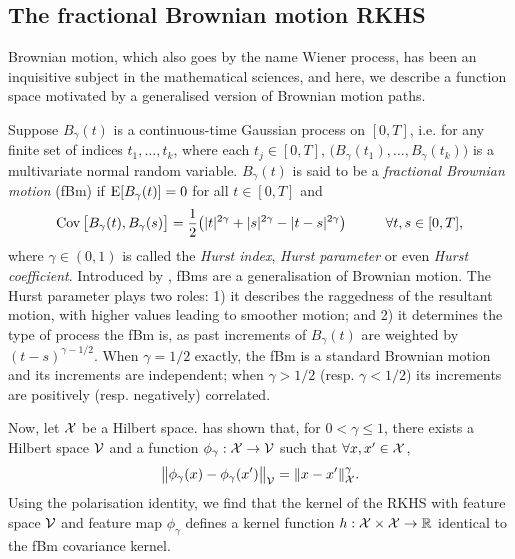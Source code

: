 \subsection{The fractional Brownian motion RKHS}

Brownian motion, which also goes by the name Wiener process, has been an inquisitive subject in the mathematical sciences, and here, we describe a function space motivated by a generalised version of Brownian motion paths.

Suppose $B_\gamma(t)$ is a continuous-time Gaussian process on $[0,T]$, i.e. for any finite set of indices $t_1,\dots,t_k$, where each $t_j \in [0,T]$, $\big(B_\gamma(t_1),\dots,B_\gamma(t_k)\big)$ is a multivariate normal random variable.
$B_\gamma(t)$ is said to be a \emph{fractional Brownian motion} (fBm) if $\operatorname{E} [B_\gamma(t)] = 0$ for all $t \in [0,T]$ and 
\vspace{-0.5em}
\[
  \operatorname{Cov}\big[ B_\gamma(t),B_\gamma(s) \big] = \frac{1}{2}\big( |t|^{2\gamma} + |s|^{2\gamma} - |t-s|^{2\gamma} \big) \hspace{1cm} \forall t,s \in [0,T],
\]
where $\gamma \in (0,1)$ is called the \emph{Hurst index}, \emph{Hurst parameter} or even \emph{Hurst coefficient}.
Introduced by \citet{mandelbrot1968fractional}, fBms are a generalisation of Brownian motion.
The Hurst parameter plays two roles: 1) it describes the raggedness of the resultant motion, with higher values leading to smoother motion; and 2) it determines the type of process the fBm is, as past increments of $B_\gamma(t)$ are weighted by $(t-s)^{\gamma-1/2}$.
When $\gamma=1/2$ exactly, the fBm is a standard Brownian motion and its increments are independent; when $\gamma > 1/2$ (resp. $\gamma < 1/2$) its increments are positively (resp. negatively) correlated.

Now, let ${\mathcal X}$ be a Hilbert space. 
\citet[Theorem 3]{schoenberg1937} has shown that, for $0 < \gamma\leq 1$, there exists a Hilbert space ${\mathcal V}$ and a function $\phi_\gamma:{\mathcal X}\to{\mathcal V}$ such that $\forall x,x' \in {\mathcal X}$,
\[
  \big\Vert \phi_\gamma(x) - \phi_\gamma(x') \big\Vert_{\mathcal V} = \lVert x-x'\rVert_{\mathcal X}^\gamma.
\]
Using the polarisation identity, 
we find that the kernel of the RKHS with feature space ${\mathcal V}$ and feature map $\phi_\gamma$ defines a kernel function $h:{\mathcal X}\times{\mathcal X}\to\mathbb{R}$ identical to the fBm covariance kernel.

